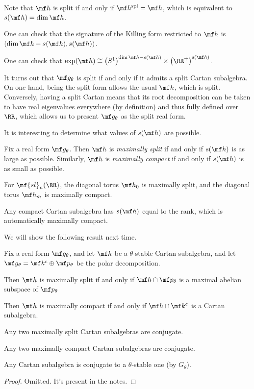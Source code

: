 \documentclass[../notes.tex]{subfiles}
\begin{document}
\begin{remark}
	Note that $\mf h$ is split if and only if $\mf h^{\mathrm{spl}}=\mf h$, which is equivalent to $s(\mf h)=\dim\mf h$.
\end{remark}
\begin{remark}
	One can check that the signature of the Killing form restricted to $\mf h$ is $(\dim\mf h-s(\mf h),s(\mf h))$.
\end{remark}
\begin{remark}
	One can check that $\exp(\mf h)\cong\left(S^1\right)^{\dim\mf h-s(\mf h)}\times\left(\RR^+\right)^{s(\mf h)}$.
\end{remark}
\begin{remark}
	It turns out that $\mf g_\theta$ is split if and only if it admits a split Cartan subalgebra. On one hand, being the split form allows the usual $\mf h$, which is split. Conversely, having a split Cartan means that its root decomposition can be taken to have real eigenvalues everywhere (by definition) and thus fully defined over $\RR$, which allows us to present $\mf g_\theta$ as the split real form.
\end{remark}
It is interesting to determine what values of $s(\mf h)$ are possible.
\begin{definition}
	Fix a real form $\mf g_\theta$. Then $\mf h$ is \textit{maximally split} if and only if $s(\mf h)$ is as large as possible. Similarly, $\mf h$ is \textit{maximally compact} if and only if $s(\mf h)$ is as small as possible.
\end{definition}
\begin{example}
	For $\mf{sl}_n(\RR)$, the diagonal torus $\mf h_0$ is maximally split, and the diagonal torus $\mf h_m$ is maximally compact.
\end{example}
\begin{remark}
	Any compact Cartan subalgebra has $s(\mf h)$ equal to the rank, which is automatically maximally compact.
\end{remark}
We will show the following result next time.
\begin{proposition}
	Fix a real form $\mf g_\theta$, and let $\mf h$ be a $\theta$-stable Cartan subalgebra, and let $\mf g_\theta=\mf k^c\oplus\mf p_\theta$ be the polar decomposition.
	\begin{listalph}
		\item Then $\mf h$ is maximally split if and only if $\mf h\cap\mf p_\theta$ is a maximal abelian subspace of $\mf p_\theta$
		\item Then $\mf h$ is maximally compact if and only if $\mf h\cap\mf k^c$ is a Cartan subalgebra.
		\item Any two maximally split Cartan subalgebras are conjugate.
		\item Any two maximally compact Cartan subalgebras are conjugate.
		\item Any Cartan subalgebra is conjugate to a $\theta$-stable one (by $G_\theta$).
	\end{listalph}
\end{proposition}
\begin{proof}
	Omitted. It's present in the notes.
\end{proof}
\end{document}
